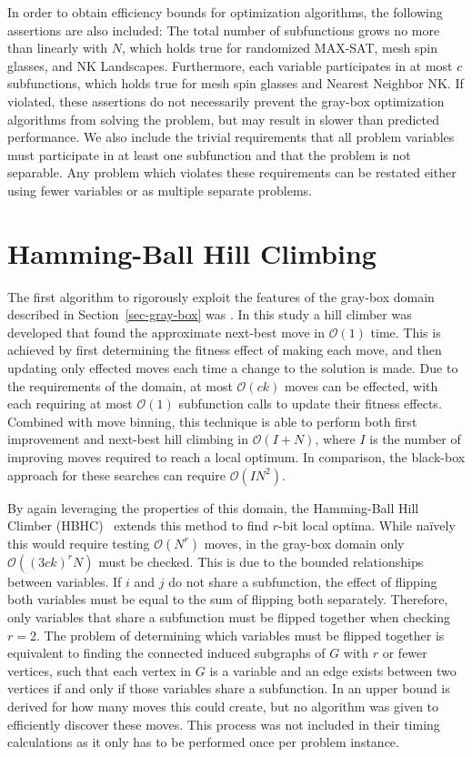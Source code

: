 \documentclass{sig-alternate}
\newcommand{\BigO}[1]{$\mathcal{O}{(#1)}$}
\begin{document}
In order to obtain efficiency bounds for optimization algorithms, the following
assertions are also included: The total number of subfunctions grows no more than
linearly with $N$, which holds true for randomized MAX-SAT, mesh spin glasses, and NK Landscapes.
Furthermore, each variable participates in at most $c$ subfunctions, which holds true
for mesh spin glasses and Nearest Neighbor NK. If violated, these assertions do not
necessarily prevent the gray-box optimization algorithms from solving the problem, but may result
in slower than predicted performance.
We also include the trivial requirements that all problem variables must participate
in at least one subfunction and that the problem is not separable. Any problem which
violates these requirements can be restated either using fewer variables or as multiple separate problems.

\section{Hamming-Ball Hill Climbing}
\label{sec-hamming}
The first algorithm to rigorously exploit the features of the gray-box domain
described in Section~\ref{sec-gray-box} was \cite{whitley:2013:greedy}. In this study
a hill climber was developed that found the approximate next-best move in \BigO{1} time.
This is achieved by first determining the fitness effect of making each move, and then updating
only effected moves each time a change to the solution is made. Due to the requirements of the domain,
at most \BigO{ck} moves can be effected, with each requiring at most \BigO{1} subfunction calls
to update their fitness effects. Combined with move binning, this technique is able to perform both
first improvement and next-best hill climbing in \BigO{I+N}, where $I$ is the number of improving
moves required to reach a local optimum. In comparison, the black-box approach for these searches can require
\BigO{IN^2}.

By again leveraging the properties of this domain, the Hamming-Ball Hill Climber (HBHC)~\cite{chicano:2014:ball} extends this
method to find $r$-bit local optima. While na\"ively this would require testing \BigO{N^r} moves, in the gray-box domain only
\BigO{(3ck)^rN} must be checked. This is due to the bounded relationships between variables.
If $i$ and $j$ do not share a subfunction, the effect of flipping both variables
must be equal to the sum of flipping both separately. Therefore, only variables that share
a subfunction must be flipped together when checking $r=2$. The problem of determining
which variables must be flipped together is equivalent to finding the connected induced
subgraphs of $G$ with $r$ or fewer vertices, such that each vertex in $G$ is a variable
and an edge exists between two vertices if and only if those variables share a subfunction.
In \cite{chicano:2014:ball} an upper bound is derived for how many moves this could create,
but no algorithm was given to efficiently discover these moves. This process was not included
in their timing calculations as it only has to be performed once per problem instance.
\end{document}
